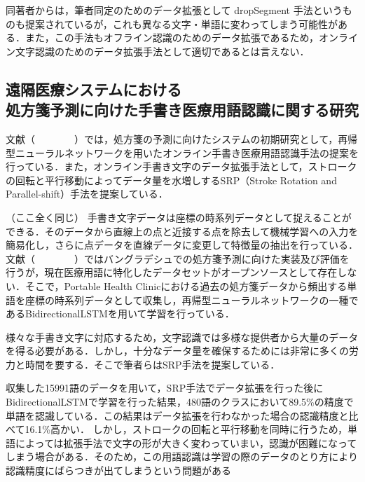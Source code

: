 同著者からは，筆者同定のためのデータ拡張として dropSegment 手法というものも提案されているが\cite{yang16:dropsegment}，これも異なる文字・単語に変わってしまう可能性がある．また，この手法もオフライン認識のためのデータ拡張であるため，オンライン文字認識のためのデータ拡張手法として適切であるとは言えない．

\subsection{遠隔医療システムにおける\\処方箋予測に向けた手書き医療用語認識に関する研究}
文献（　　　　）では，処方箋の予測に向けたシステムの初期研究として，再帰型ニューラルネットワークを用いたオンライン手書き医療用語認識手法の提案を行っている．また，オンライン手書き文字のデータ拡張手法として，ストロークの回転と平行移動によってデータ量を水増しするSRP（Stroke Rotation and Parallel-shift）手法を提案している．

（ここ全く同じ）
手書き文字データは座標の時系列データとして捉えることができる．そのデータから直線上の点と近接する点を除去して機械学習への入力を簡易化し，さらに点データを直線データに変更して特徴量の抽出を行っている．文献（　　　　）ではバングラデシュでの処方箋予測に向けた実装及び評価を行うが，現在医療用語に特化したデータセットがオープンソースとして存在しない．そこで，Portable Health Clinicにおける過去の処方箋データから頻出する単語を座標の時系列データとして収集し，再帰型ニューラルネットワークの一種であるBidirectionalLSTMを用いて学習を行っている．

様々な手書き文字に対応するため，文字認識では多様な提供者から大量のデータを得る必要がある．しかし，十分なデータ量を確保するためには非常に多くの労力と時間を要する．そこで筆者らはSRP手法を提案している．

収集した15991語のデータを用いて，SRP手法でデータ拡張を行った後にBidirectionalLSTMで学習を行った結果，480語のクラスにおいて89.5\%の精度で単語を認識している．この結果はデータ拡張を行わなかった場合の認識精度と比べて16.1\%高かい．
しかし，ストロークの回転と平行移動を同時に行うため，単語によっては拡張手法で文字の形が大きく変わっていまい，認識が困難になってしまう場合がある．そのため，この用語認識は学習の際のデータのとり方により認識精度にばらつきが出てしまうという問題がある

